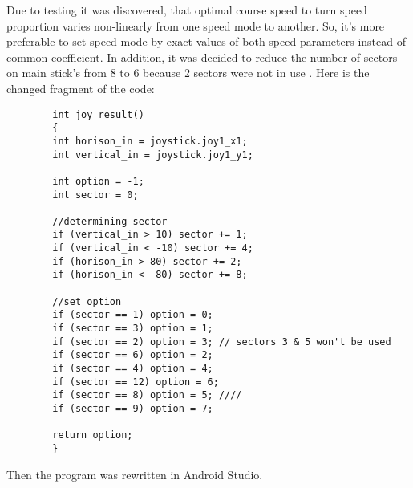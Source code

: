 \begin{enumerate*}
{\begin{verbatim}
	    	\end{verbatim} 
	    }
	    \item Due to testing it was discovered, that optimal course speed to turn speed proportion varies non-linearly from one speed mode to another. So, it's more preferable to set speed mode by exact values of both speed parameters instead of common coefficient. In addition, it was decided to reduce the number of sectors on main stick's from 8 to 6 because 2 sectors were not in use %
	    .\newline
	    Here is the changed fragment of the code: \newline
	    {\small
	    \begin{verbatim}
  	    int joy_result()
  	    {
  		int horison_in = joystick.joy1_x1;
  		int vertical_in = joystick.joy1_y1;
  		
  		int option = -1;
  		int sector = 0;
  		
  		//determining sector
  		if (vertical_in > 10) sector += 1;
  		if (vertical_in < -10) sector += 4;
  		if (horison_in > 80) sector += 2;
  		if (horison_in < -80) sector += 8;
  		
  		//set option
  		if (sector == 1) option = 0;
  		if (sector == 3) option = 1;
  		if (sector == 2) option = 3; // sectors 3 & 5 won't be used
  		if (sector == 6) option = 2;
  		if (sector == 4) option = 4;
  		if (sector == 12) option = 6;
  		if (sector == 8) option = 5; ////
  		if (sector == 9) option = 7;
  		
  		return option;
  	    }
        \end{verbatim} 
        }
        
        \item Then the program was rewritten in Android Studio.
  \end{enumerate*}
  
  
\fillpage
